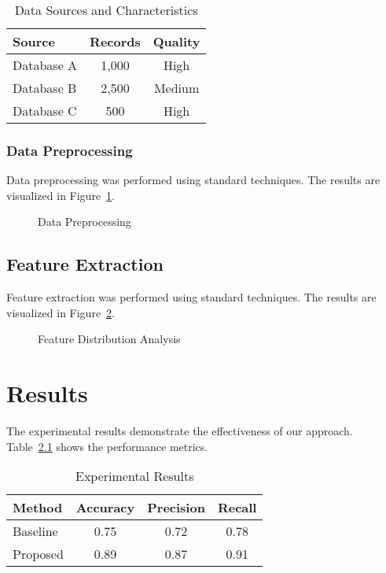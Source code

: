 \documentclass{article}
\begin{document}
\begin{table}[h]
\centering
\caption{Data Sources and Characteristics}
\label{tab:data_sources}
\begin{tabular}{|l|c|c|}
\hline
Source & Records & Quality \\
\hline
Database A & 1,000 & High \\
Database B & 2,500 & Medium \\
Database C & 500 & High \\
\hline
\end{tabular}
\end{table}

\subsection{Data Preprocessing}
\label{subsec:data_preprocessing}

Data preprocessing was performed using standard techniques. The results are visualized in Figure~\ref{fig:data_preprocessing}.

\begin{figure}[h]
\centering
\caption{Data Preprocessing}
\label{fig:data_preprocessing}
\end{figure}

\section{Feature Extraction}
\label{sec:features}

Feature extraction was performed using standard techniques. The results are visualized in Figure~\ref{fig:features}.

\begin{figure}[h]
\centering
\caption{Feature Distribution Analysis}
\label{fig:features}
\end{figure}

\chapter{Results}
\label{chap:results}

The experimental results demonstrate the effectiveness of our approach. Table~\ref{tab:results} shows the performance metrics.

\begin{table}[h]
\centering
\caption{Experimental Results}
\label{tab:results}
\begin{tabular}{|l|c|c|c|}
\hline
Method & Accuracy & Precision & Recall \\
\hline
Baseline & 0.75 & 0.72 & 0.78 \\
Proposed & 0.89 & 0.87 & 0.91 \\
\hline
\end{tabular}
\end{table}
\end{document}
